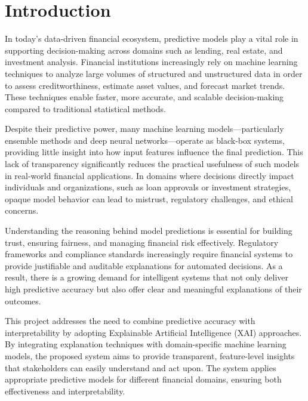 
\section{Introduction}

In today's data-driven financial ecosystem, predictive models play a vital role in supporting decision-making across domains such as lending, real estate, and investment analysis. Financial institutions increasingly rely on machine learning techniques to analyze large volumes of structured and unstructured data in order to assess creditworthiness, estimate asset values, and forecast market trends. These techniques enable faster, more accurate, and scalable decision-making compared to traditional statistical methods.

Despite their predictive power, many machine learning models---particularly ensemble methods and deep neural networks---operate as black-box systems, providing little insight into how input features influence the final prediction. This lack of transparency significantly reduces the practical usefulness of such models in real-world financial applications. In domains where decisions directly impact individuals and organizations, such as loan approvals or investment strategies, opaque model behavior can lead to mistrust, regulatory challenges, and ethical concerns.

Understanding the reasoning behind model predictions is essential for building trust, ensuring fairness, and managing financial risk effectively. Regulatory frameworks and compliance standards increasingly require financial systems to provide justifiable and auditable explanations for automated decisions. As a result, there is a growing demand for intelligent systems that not only deliver high predictive accuracy but also offer clear and meaningful explanations of their outcomes.

This project addresses the need to combine predictive accuracy with interpretability by adopting Explainable Artificial Intelligence (XAI) approaches. By integrating explanation techniques with domain-specific machine learning models, the proposed system aims to provide transparent, feature-level insights that stakeholders can easily understand and act upon. The system applies appropriate predictive models for different financial domains, ensuring both effectiveness and interpretability.

